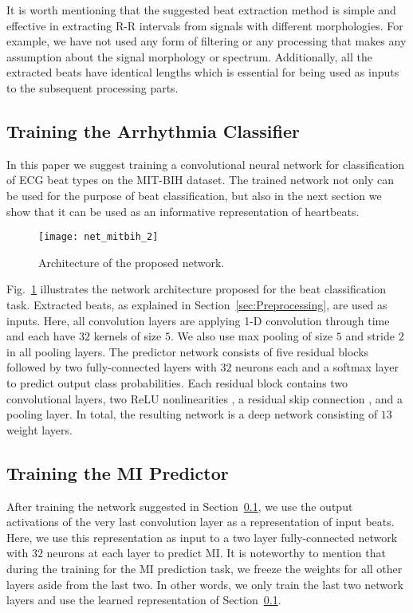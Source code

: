 \documentclass[10pt, conference, compsocconf]{IEEEtran}
\begin{document}
It is worth mentioning that the suggested beat extraction method is simple and effective in extracting R-R intervals from signals with different morphologies. For example, we have not used any form of filtering or any processing that makes any assumption about the signal morphology or spectrum. Additionally, all the extracted beats have identical lengths which is essential for being used as inputs to the subsequent processing parts.


\subsection{Training the Arrhythmia Classifier}
\label{sec:Training the Arrhythmia Classifier}
In this paper we suggest training a convolutional neural network for classification of ECG beat types on the MIT-BIH dataset. The trained network not only can be used for the purpose of beat classification, but also in the next section we show that it can be used as an informative representation of heartbeats.

\begin{figure}[!t]
\centering
\texttt{[image: net\_mitbih\_2]}\caption{Architecture of the proposed network.}
\label{fig:net_mitbih}
\end{figure}

Fig.~\ref{fig:net_mitbih} illustrates the network architecture proposed for the beat classification task. Extracted beats, as explained in Section~\ref{sec:Preprocessing}, are used as inputs. Here, all convolution layers are applying 1-D convolution through time and each have $32$ kernels of size $5$. We also use max pooling of size $5$ and stride $2$ in all pooling layers. The predictor network consists of five residual blocks followed by two fully-connected layers with $32$ neurons each and a softmax layer to predict output class probabilities. Each residual block contains two convolutional layers, two ReLU nonlinearities \cite{nair2010rectified}, a residual skip connection \cite{he2016deep}, and a pooling layer. In total, the resulting network is a deep network consisting of $13$ weight layers.

\subsection{Training the MI Predictor}
After training the network suggested in Section~\ref{sec:Training the Arrhythmia Classifier}, we use the output activations of the very last convolution layer as a representation of input beats. Here, we use this representation as input to a two layer fully-connected network with $32$ neurons at each layer to predict MI. It is noteworthy to mention that during the training for the MI prediction task, we freeze the weights for all other layers aside from the last two. In other words, we only train the last two network layers and use the learned representation of Section~\ref{sec:Training the Arrhythmia Classifier}. 
\end{document}
